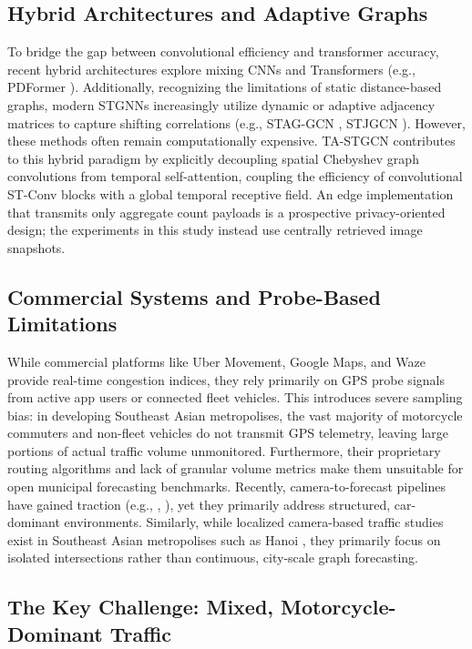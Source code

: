 \documentclass[a4paper,fleqn]{cas-sc}
\begin{document}
\subsection{Hybrid Architectures and Adaptive Graphs}
To bridge the gap between convolutional efficiency and transformer accuracy, recent hybrid architectures explore mixing CNNs and Transformers (e.g., PDFormer \cite{pdformer}). Additionally, recognizing the limitations of static distance-based graphs, modern STGNNs increasingly utilize dynamic or adaptive adjacency matrices to capture shifting correlations (e.g., STAG-GCN \cite{staggcn}, STJGCN \cite{stjgcn}). However, these methods often remain computationally expensive. TA-STGCN contributes to this hybrid paradigm by explicitly decoupling spatial Chebyshev graph convolutions from temporal self-attention, coupling the efficiency of convolutional ST-Conv blocks with a global temporal receptive field. An edge implementation that transmits only aggregate count payloads is a prospective privacy-oriented design; the experiments in this study instead use centrally retrieved image snapshots.

\subsection{Commercial Systems and Probe-Based Limitations}
While commercial platforms like Uber Movement, Google Maps, and Waze provide real-time congestion indices, they rely primarily on GPS probe signals from active app users or connected fleet vehicles. This introduces severe sampling bias: in developing Southeast Asian metropolises, the vast majority of motorcycle commuters and non-fleet vehicles do not transmit GPS telemetry, leaving large portions of actual traffic volume unmonitored. Furthermore, their proprietary routing algorithms and lack of granular volume metrics make them unsuitable for open municipal forecasting benchmarks. Recently, camera-to-forecast pipelines have gained traction (e.g., \cite{feng2024}, \cite{liu2024}), yet they primarily address structured, car-dominant environments. Similarly, while localized camera-based traffic studies exist in Southeast Asian metropolises such as Hanoi \cite{vu2026}, they primarily focus on isolated intersections rather than continuous, city-scale graph forecasting.

\subsection{The Key Challenge: Mixed, Motorcycle-Dominant Traffic}
\label{sec:gap}
\end{document}
